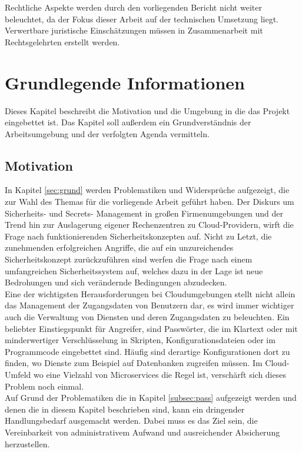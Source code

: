 \documentclass[
book,
a4paper,   
titlepage,  
halfparskip,
12pt        
]{scrartcl}
\begin{document}
\begin{onehalfspacing}
Rechtliche Aspekte werden durch den vorliegenden Bericht nicht weiter beleuchtet, da der Fokus dieser Arbeit auf der technischen Umsetzung liegt. Verwertbare juristische Einschätzungen müssen in Zusammenarbeit mit Rechtsgelehrten erstellt werden.
\newpage

\section{Grundlegende Informationen}
\label{sec:inf}
Dieses Kapitel beschreibt die Motivation und die Umgebung in die das Projekt eingebettet ist. Das Kapitel soll außerdem ein Grundverständnis der Arbeitsumgebung und der verfolgten Agenda vermitteln.

\subsection{Motivation}
In Kapitel \vref{sec:grund} werden Problematiken und Widersprüche aufgezeigt, die zur Wahl des Themas für die vorliegende Arbeit geführt haben. Der Diskurs um Sicherheits- und Secrets- Management in großen Firmenumgebungen und der Trend hin zur Auslagerung eigener Rechenzentren zu Cloud-Providern, wirft die Frage nach funktionierenden Sicherheitskonzepten auf. Nicht zu Letzt, die zunehmenden erfolgreichen Angriffe, die auf ein unzureichendes Sicherheitskonzept zurückzuführen sind werfen die Frage nach einem umfangreichen Sicherheitssystem auf, welches dazu in der Lage ist neue Bedrohungen und sich verändernde Bedingungen abzudecken.\\
Eine der wichtigsten Herausforderungen bei Cloudumgebungen stellt nicht allein das Management der Zugangsdaten von Benutzern dar, es wird immer wichtiger auch die Verwaltung von Diensten und deren Zugangsdaten zu beleuchten. Ein beliebter Einstiegspunkt für Angreifer, sind Passwörter, die im Klartext oder mit minderwertiger Verschlüsselung in Skripten, Konfigurationsdateien oder im Programmcode eingebettet sind. Häufig sind derartige Konfigurationen dort zu finden, wo Dienste zum Beispiel auf Datenbanken zugreifen müssen. Im Cloud-Umfeld wo eine Vielzahl von Microservices die Regel ist, verschärft sich dieses Problem noch einmal.\\
Auf Grund der Problematiken die in Kapitel \vref{subsec:pass} aufgezeigt werden und denen die in diesem Kapitel beschrieben sind, kann ein dringender Handlungsbedarf ausgemacht werden. Dabei muss es das Ziel sein, die Vereinbarkeit von administrativem Aufwand und ausreichender Absicherung herzustellen. 


\end{onehalfspacing}
\end{document}
